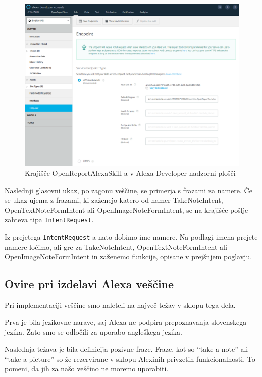 \documentclass[a4paper, 12pt]{book}
\begin{document}
\begin{figure}[H]
\begin{center}
\includegraphics[width=13cm]{skill_endpoint}
\end{center}
\caption{Krajišče OpenReportAlexaSkill-a v Alexa Developer nadzorni plošči}
\label{skill_endpoint}
\end{figure}

Naslednji glasovni ukaz, po zagonu veščine, se primerja s frazami za namere.
Če se ukaz ujema z frazami, ki zaženejo katero od namer TakeNoteIntent, OpenTextNoteFormIntent ali OpenImageNoteFormIntent, se na krajišče pošlje zahteva tipa \texttt{IntentRequest}.

Iz prejetega \texttt{IntentRequest}-a nato dobimo ime namere.
Na podlagi imena prejete namere ločimo, ali gre za TakeNoteIntent, OpenTextNoteFormIntent ali OpenImageNoteFormIntent in zaženemo funkcije, opisane v prejšnjem poglavju.

\subsection{Ovire pri izdelavi Alexa veščine}

Pri implementaciji veščine smo naleteli na največ težav v sklopu tega dela.

Prva je bila jezikovne narave, saj Alexa ne podpira prepoznavanja slovenskega jezika.
Zato smo se odločili za uporabo angleškega jezika.

Naslednja težava je bila definicija pozivne fraze.
Fraze, kot so \enquote{take a note} ali \enquote{take a picture} so že rezervirane v sklopu Alexinih privzetih funkcionalnosti.
To pomeni, da jih za našo veščino ne moremo uporabiti.
\end{document}
